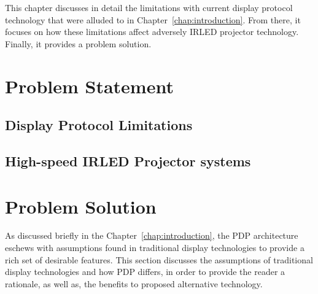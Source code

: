 \label{chap:problem_formulation}

This chapter discusses in detail the limitations with current display protocol technology that were alluded to in Chapter~\ref{chap:introduction}. From there, it focuses on how these limitations affect adversely IRLED projector technology. Finally, it provides a problem solution.

\section{Problem Statement}

\subsection{Display Protocol Limitations}

\subsection{High-speed IRLED Projector systems}

\section{Problem Solution}

As discussed briefly in the Chapter~\ref{chap:introduction}, the PDP architecture eschews with assumptions found in traditional display technologies to provide a rich set of desirable features. This section discusses the assumptions of traditional display technologies and how PDP differs, in order to provide the reader a rationale, as well as, the benefits to proposed alternative technology.

